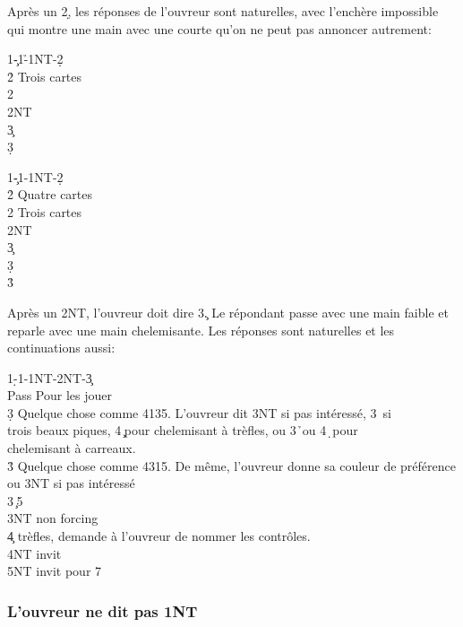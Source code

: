 \documentclass[a4paper]{article}
\begin{document}
Après un 2\d , les réponses de l'ouvreur sont naturelles, avec l'enchère impossible
qui montre une main avec une courte qu'on ne peut pas annoncer autrement:

\begin{bidtable}
1\c-1\h-1NT-2\d\+\\
2\h \> Trois cartes\\
2\s {}\\
2NT \\
3\c {}\\
3\d {}\-
\end{bidtable}

\begin{bidtable}
1\c-1\s-1NT-2\d\+\\
2\h \> Quatre cartes\\
2\s \> Trois cartes\\
2NT \\
3\c {}\\
3\d {}\\
3\h {}\-
\end{bidtable}

Après un 2NT, l'ouvreur doit dire 3\c . Le répondant passe avec une main faible
et reparle avec une main chelemisante. Les réponses sont naturelles et les
continuations aussi:

\begin{bidtable}
1\d-1\s-1NT-2NT-3\c\+\\
Pass \> Pour les jouer\\
3\d \> Quelque chose comme 4135. L'ouvreur dit 3NT si pas intéressé, 3\s\ si\\
\>trois beaux piques, 4\c\ pour chelemisant à trèfles, ou 3\h\ ou 4\d\ pour\\
\>chelemisant à carreaux.\\
3\h \> Quelque chose comme 4315. De même, l'ouvreur donne sa couleur de préférence\\
\>ou 3NT si pas intéressé\\
3\s {}\c\ 5\s \\
3NT  non forcing\\
4\c {} trèfles, demande à l'ouvreur de nommer les contrôles.\\
4NT  invit\\
5NT  invit pour 7\-
\end{bidtable}

\subsubsection{L'ouvreur ne dit pas 1NT}
\end{document}
